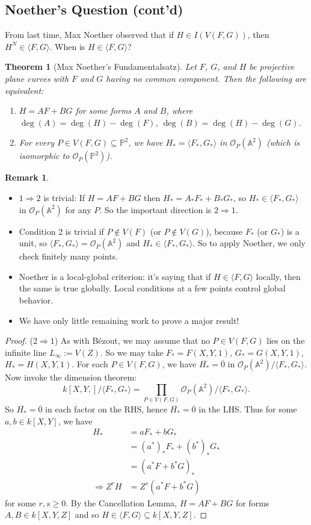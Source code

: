 \documentclass[12pt]{article}
\newcommand{\vbrack}[1]{\langle #1\rangle}
\newtheorem{theorem}{Theorem}[section]
\theoremstyle{definition}
\newtheorem*{remark}{Remark}
\begin{document}
\subsection{Noether's Question (cont'd)}
From last time, Max Noether observed that if $H\in I(V(F,G))$, then $H^N\in\vbrack{F,G}$. When is $H\in\vbrack{F,G}$?
\begin{theorem}[Max Noether's Fundamentalsatz]
    Let $F$, $G$, and $H$ be projective plane curves with $F$ and $G$ having no common component. Then the following are equivalent:
    \begin{enumerate}
        \item $H=AF+BG$ for some forms $A$ and $B$, where $\deg(A)=\deg(H)-\deg(F)$, $\deg(B)=\deg(H)-\deg(G)$.
        \item For every $P\in V(F,G)\subseteq\mathbb{P}^2$, we have $H_*=\vbrack{F_*,G_*}$ in $\mathcal{O}_P(\mathbb{A}^2)$ (which is isomorphic to $\mathcal{O}_P(\mathbb{P}^2)$).
    \end{enumerate}
\end{theorem}
\begin{remark}
   \begin{itemize}
       \item $1\Rightarrow2$ is trivial: If $H=AF+BG$ then $H_*=A_*F_*+B_*G_*$, so $H_*\in\vbrack{F_*,G_*}$ in $\mathcal{O}_P(\mathbb{A}^2)$ for any $P$. So the important direction is $2\Rightarrow1$.
       \item Condition 2 is trivial if $P\notin V(F)$ (or $P\notin V(G)$), because $F_*$ (or $G_*$) is a unit, so $\vbrack{F_*,G_*}=\mathcal{O}_P(\mathbb{A}^2)$ and $H_*\in\vbrack{F_*,G_*}$. So to apply Noether, we only check finitely many points.
       \item Noether is a local-global criterion: it's saying that if $H\in\vbrack{F,G}$ locally, then the same is true globally. Local conditions at a few points control global behavior.
       \item We have only little remaining work to prove a major result!
   \end{itemize}
\end{remark}
\begin{proof}
    ($2\Rightarrow1$) As with B\'ezout, we may assume that no $P\in V(F,G)$ lies on the infinite line $L_{\infty}:=V(Z)$. So we may take $F_*=F(X,Y,1)$, $G_*=G(X,Y,1)$, $H_*=H(X,Y,1)$. For each $P\in V(F,G)$, we have $\overline{H_*}=\overline{0}$ in $\mathcal{O}_P(\mathbb{A}^2)/\vbrack{F_*,G_*}$. Now invoke the dimension theorem:
    \[k[X,Y,]/\vbrack{F_*,G_*}=\prod\limits_{P\in V(F,G)}\mathcal{O}_P(\mathbb{A}^2)/\vbrack{F_*,G_*}.\]
    So $\overline{H_*}=\overline{0}$ in each factor on the RHS, hence $\overline{H_*}=\overline{0}$ in the LHS. Thus for some $a,b\in k[X,Y]$, we have
    \begin{align*}
        H_*&=aF_*+bG_*\\
        &=(a^*)_*F_*+(b^*)_*G_*\\
        &=(a^*F+b^*G)_*\\
        \Rightarrow Z^rH&=Z^s(a^*F+b^*G)
    \end{align*}
    for some $r,s\geq0$. By the Cancellation Lemma, $H=AF+BG$ for forms $A,B\in k[X,Y,Z]$ and so $H\in\vbrack{F,G}\subseteq k[X,Y,Z]$.
\end{proof}
\end{document}
